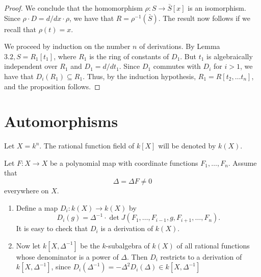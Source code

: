 \documentclass[12pt, oneside]{book}
\begin{document}
\begin{proposition}
\begin{proof}
        We conclude that the homomorphism $\rho: S \longrightarrow \bar{S}[x]$ is an isomorphism. Since $\rho \cdot D=d / d x \cdot \rho$, we have that $R=\rho^{-1}(\bar{S})$. The result now follows if we recall that $\rho(t)=x$.

        We proceed by induction on the number $n$ of derivations. By Lemma $3.2, S=R_1\left[t_1\right]$, where $R_1$ is the ring of constants of $D_1$. But $t_1$ is algebraically independent over $R_1$ and $D_1=d / d t_1$. Since $D_1$ commutes with $D_i$ for $i>1$, we have that $D_i\left(R_1\right) \subseteq R_1$. Thus, by the induction hypothesis, $R_1=R\left[t_2, \ldots t_n\right]$, and the proposition follows.
    \end{proof}
\end{proposition}



\section{Automorphisms}
Let $X=k^n$. The rational function field of $k[X]$ will be denoted by $k(X)$.
\begin{definition}

    Let $F: X \rightarrow X$ be a polynomial map with coordinate functions $F_1, \ldots, F_n$. Assume that
    \begin{equation*}
        \Delta=\Delta F \neq 0
    \end{equation*}
    everywhere on $X$.

    \begin{enumerate}
        \item
              Define a map $D_i: k(X) \rightarrow k(X)$ by
              \begin{equation*}
                  D_i(g)=\Delta^{-1} \cdot \operatorname{det} J\left(F_1, \ldots, F_{i-1}, g, F_{i+1}, \ldots, F_n\right) .
              \end{equation*}
              It is easy to check that $D_i$ is a derivation of $k(X)$.

        \item
              Now let $k\left[X, \Delta^{-1}\right]$ be the $k$-subalgebra of $k(X)$ of all rational functions whose denominator is a power of $\Delta$. Then $D_i$ restricts to a derivation of $k\left[X, \Delta^{-1}\right]$, since $D_i\left(\Delta^{-1}\right)=-\Delta^2 D_i(\Delta)
                  \in
                  k\left[X, \Delta^{-1}\right] $
    \end{enumerate}
\end{definition}
\end{document}
